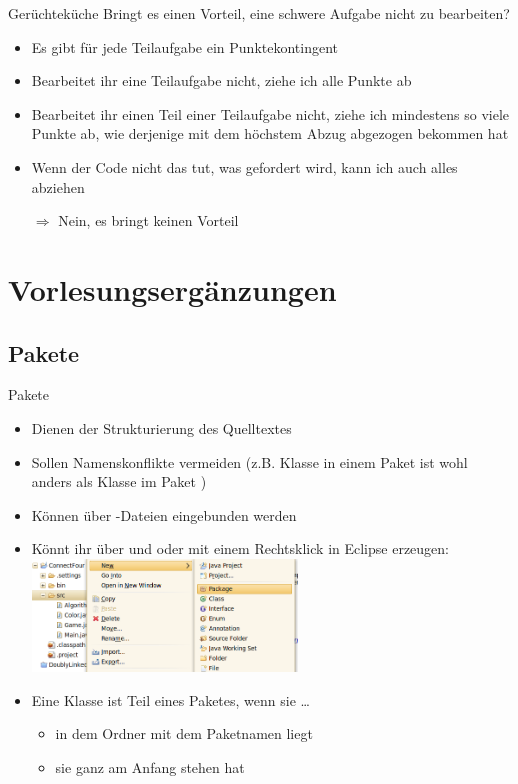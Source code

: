 \documentclass[usepdftitle=false,hyperref={pdfpagelabels=false}]{beamer}
\begin{document}
\begin{frame}{Gerüchteküche}
  Bringt es einen Vorteil, eine schwere Aufgabe nicht zu bearbeiten?
  \begin{itemize}[<+->]
    \item Es gibt für jede Teilaufgabe ein Punktekontingent
    \item Bearbeitet ihr eine Teilaufgabe nicht, ziehe ich alle Punkte ab
    \item Bearbeitet ihr einen Teil einer Teilaufgabe nicht, ziehe
          ich mindestens so viele Punkte ab, wie derjenige mit dem
          höchstem Abzug abgezogen bekommen hat
    \item Wenn der Code nicht das tut, was gefordert wird, kann ich
          auch alles abziehen
    \item[$\Rightarrow$] Nein, es bringt keinen Vorteil
  \end{itemize}
\end{frame}

\section{Vorlesungsergänzungen}
\subsection{Pakete}
\begin{frame}{Pakete}
    \begin{itemize}[<+->]
      \item Dienen der Strukturierung des Quelltextes
      \item Sollen Namenskonflikte vermeiden (z.B. Klasse 
            in einem Paket  ist wohl anders als Klasse
             im Paket )
      \item Können über -Dateien eingebunden werden
      \item Könnt ihr über  und 
            oder mit einem Rechtsklick in Eclipse erzeugen:
        \includegraphics[height=30mm]{new-package.png}\\
      \item Eine Klasse ist Teil eines Paketes, wenn sie \dots
        \begin{itemize}
            \item in dem Ordner mit dem Paketnamen liegt
            \item sie  ganz am Anfang stehen hat
        \end{itemize}
    \end{itemize}
\end{frame}
\end{document}
